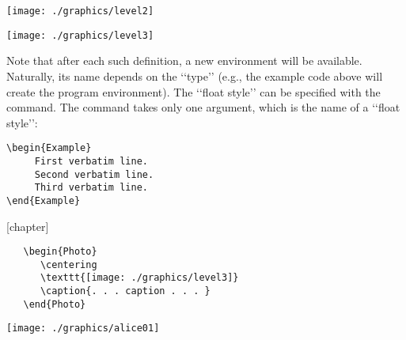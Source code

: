 \begin{Photo}
 \centering
 \texttt{[image: ./graphics/level2]}
\caption{. . . caption . . . }
\end{Photo}

\begin{Photo}
 \centering
 \texttt{[image: ./graphics/level3]}
\caption{. . . caption . . . }
\end{Photo}



Note that after each such definition, a new 
environment will be available. Naturally,
its name depends on the ‘‘type’’ (e.g., the example code above will create the program
environment). The ‘‘float style’’ can be specified with the  command. The
command takes only one argument, which is the name of a ‘‘float style’’:

\begin{lstlisting}[language={[common]TeX},% 
                           alsolanguage={[LaTeX]TeX},% 
                           alsolanguage={[primitive]TeX},%
                           alsolanguage={Verse}]
\begin{Example}
     First verbatim line.
     Second verbatim line.
     Third verbatim line.
\end{Example}
\end{lstlisting}


[chapter]

 \begin{Example}
 \begin{verbatim}
   \begin{Photo}
      \centering
      \texttt{[image: ./graphics/level3]}
      \caption{. . . caption . . . }
   \end{Photo}
\end{verbatim}
\caption{Example using verbatim code}
 \end{Example}

\begin{Photo}
 \centering
 \texttt{[image: ./graphics/alice01]}
\caption{. . . caption . . . }
\end{Photo}

\newlength{\egwidth}\setlength{\egwidth}{0.48\textwidth}

\newenvironment{ega}%
{\begin{list}{}{\setlength{\leftmargin}{0.02\textwidth}%
\setlength{\rightmargin}{\leftmargin}}\item[]\footnotesize}%
{\end{list}}

